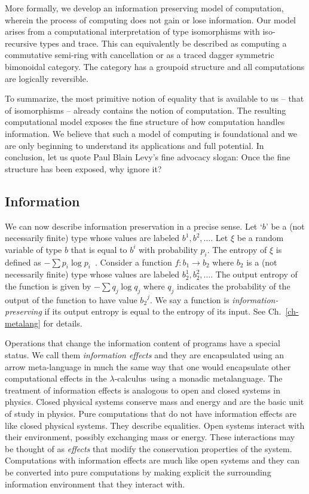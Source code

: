 \documentclass{article}
\newcommand{\lcal}{\ensuremath{\lambda}-calculus}
\begin{document}
More formally, we develop an information preserving model of
computation, wherein the process of computing does not gain or lose
information. Our model arises from a computational interpretation of
type isomorphisms with iso-recursive types and trace. This can
equivalently be described as computing a commutative semi-ring with
cancellation or as a traced dagger symmetric bimonoidal category. The
category has a groupoid structure and all computations are logically
reversible.

To summarize, the most primitive notion of equality that is available
to us -- that of isomorphisms -- already contains the notion of
computation. The resulting computational model exposes the fine
structure of how computation handles information. We believe that such
a model of computing is foundational and we are only beginning to
understand its applications and full potential. In conclusion, let us
quote Paul Blain Levy's fine advocacy slogan: Once the fine structure
has been exposed, why ignore it?

\subsection{Information}

We can now describe information preservation in a precise sense.  Let
`$b$' be a (not necessarily finite) type whose values are labeled
$b^1, b^2, \ldots$. Let $\xi$ be a random variable of type $b$ that is
equal to $b^i$ with probability $p_i$. The entropy of $\xi$ is defined
as $-\sum p_i \log{p_i}$~\cite{Shannon1948}.  Consider a function
$f : b_1 \rightarrow b_2$ where $b_2$ is a (not necessarily finite)
type whose values are labeled $b_2^1, b_2^2, \ldots$. The output
entropy of the function is given by $- \sum q_j \log{q_j}$ where $q_j$
indicates the probability of the output of the function to have value
${b_2}^j$. We say a function is \emph{information-preserving} if its
output entropy is equal to the entropy of its input. See
Ch.~\ref{ch-metalang} for details.

Operations that change the information content of programs have a
special status. We call them \emph{information effects} and they are
encapsulated using an arrow meta-language in much the same way that
one would encapsulate other computational effects in the \lcal\ using a
monadic metalanguage.  The treatment of information effects is
analogous to open and closed systems in physics. Closed physical
systems conserve mass and energy and are the basic unit of study in
physics. Pure computations that do not have information effects are
like closed physical systems. They describe equalities.  Open systems
interact with their environment, possibly exchanging mass or
energy. These interactions may be thought of as \emph{effects} that
modify the conservation properties of the system. Computations with
information effects are much like open systems and they can be
converted into pure computations by making explicit the surrounding
information environment that they interact with.
\end{document}
